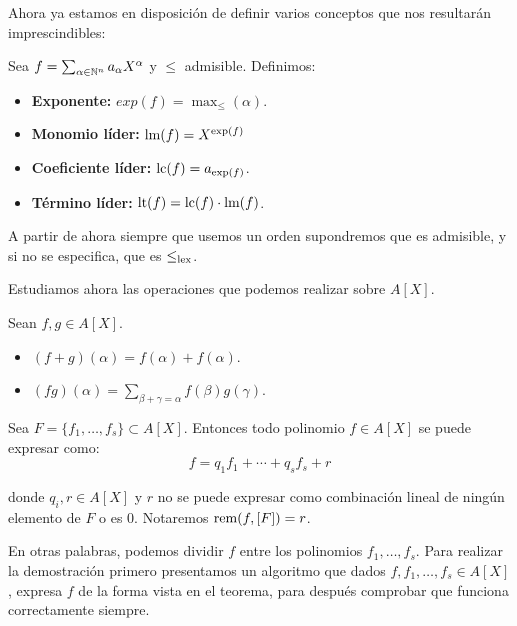 Ahora ya estamos en disposición de definir varios conceptos que nos resultarán imprescindibles:

\begin{definicion}
  Sea $f= \sum_{\alpha\in \mathbb{N}^n} a_{\alpha} X^{\alpha}$ y $\le$ admisible. Definimos:
  \begin{itemize}
    \item \textbf{Exponente:} $exp(f) = \max_{\le}(\alpha)$.
    \item \textbf{Monomio líder:} $\text{lm}(f) = X^{\text{exp}(f)}$
    \item \textbf{Coeficiente líder:} $\text{lc}(f) = a_{\text{exp}(f)}$.
    \item \textbf{Término líder:} $\text{lt}(f) = \text{lc}(f) \cdot \text{lm}(f)$.
  \end{itemize}
\end{definicion}

A partir de ahora siempre que usemos un orden supondremos que es admisible, y si no se especifica, que es $\le_{\text{lex}}$.

Estudiamos ahora las operaciones que podemos realizar sobre $A[X]$.

\begin{proposicion}
  Sean $f,g\in A[X]$.
  \begin{itemize}
    \item $(f+g)(\alpha) = f(\alpha) + f(\alpha)$.
    \item $(fg)(\alpha) = \sum_{\beta+\gamma=\alpha} f(\beta)g(\gamma)$.
  \end{itemize}
\end{proposicion}

\begin{teorema}
  Sea $F=\{f_1,\dots, f_s\} \subset A[X]$. Entonces todo polinomio $f\in A[X]$ se puede expresar como:
  \begin{equation*}
    f = q_1f_1 + \cdots + q_sf_s + r
  \end{equation*}

  donde $q_i, r\in A[X]$ y $r$ no se puede expresar como combinación lineal de ningún elemento de $F$ o es $0$. Notaremos $\text{rem}(f, [F]) = r$.
\end{teorema}

En otras palabras, podemos dividir $f$ entre los polinomios $f_1, \dots, f_s$. Para realizar la demostración primero presentamos un algoritmo que dados $f,f_1,\dots, f_s \in A[X]$, expresa $f$ de la forma vista en el teorema, para después comprobar que funciona correctamente siempre.

